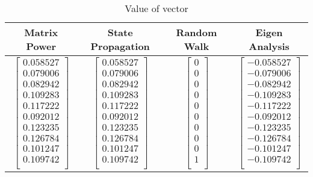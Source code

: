 \documentclass[11pt]{article}
\begin{document}
    \begin{table}[!h] 
    \centering
    \label{6E}
    \caption{Value of vector}
    \begin{tabular}{|c|c|c|c|}
      \hline
    Matrix Power & State Propagation & Random Walk & Eigen Analysis  \\
      \hline        
      
$\begin{bmatrix}
   0.058527\\
   0.079006\\
   0.082942\\
   0.109283\\
   0.117222\\
   0.092012\\
   0.123235\\
   0.126784\\
   0.101247\\
   0.109742\\
 \end{bmatrix}$
  &
  $\begin{bmatrix}
   0.058527\\
   0.079006\\
   0.082942\\
   0.109283\\
   0.117222\\
   0.092012\\
   0.123235\\
   0.126784\\
   0.101247\\
   0.109742\\
       \end{bmatrix}$
  &
  $\begin{bmatrix}
   0\\
   0\\
   0\\
   0\\
   0\\
   0\\
   0\\
   0\\
   0\\
   1\\
     \end{bmatrix}$
 &	 
  $\begin{bmatrix}
  -0.058527\\
  -0.079006\\
  -0.082942\\
  -0.109283\\
  -0.117222\\
  -0.092012\\
  -0.123235\\
  -0.126784\\
  -0.101247\\
  -0.109742\\
     \end{bmatrix}$\\
      \hline
    \end{tabular}
\end{table}
\end{document}
